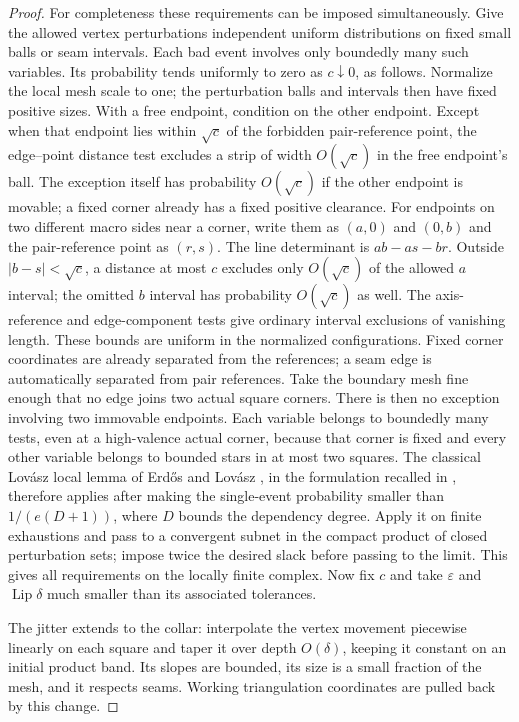 \documentclass[11pt]{article}
\numberwithin{equation}{section}
\theoremstyle{definition}
\theoremstyle{remark}
\DeclareMathOperator{\Lip}{Lip}
\begin{document}
\begin{proof}
For completeness these requirements can be imposed simultaneously.
Give the allowed vertex perturbations independent uniform
distributions on fixed small balls or seam intervals.  Each bad event
involves only boundedly many such variables.  Its probability tends
uniformly to zero as $c\downarrow0$, as follows.  Normalize the local
mesh scale to one; the perturbation balls and intervals then have
fixed positive sizes.  With a free endpoint, condition on the other
endpoint.  Except when that endpoint lies within $\sqrt c$ of the
forbidden pair-reference point, the edge--point distance test excludes
a strip of width $O(\sqrt c)$ in the free endpoint's ball.  The
exception itself has probability $O(\sqrt c)$ if the other endpoint
is movable; a fixed corner already has a fixed positive clearance.
For endpoints on two different macro sides near a corner, write them
as $(a,0)$ and $(0,b)$ and the pair-reference point as $(r,s)$.
The line determinant is $ab-as-br$.  Outside
$|b-s|<\sqrt c$, a distance at most $c$ excludes only
$O(\sqrt c)$ of the allowed $a$ interval; the omitted $b$ interval
has probability $O(\sqrt c)$ as well.  The axis-reference and
edge-component tests give ordinary interval exclusions of vanishing
length.  These bounds are uniform in the normalized configurations.
Fixed corner
coordinates are already separated from the references; a seam edge
is automatically separated from pair references.  Take the boundary
mesh fine enough that no edge joins two actual square corners.
There is then no exception involving two immovable endpoints.
Each variable belongs
to boundedly many tests, even at a high-valence actual corner,
because that corner is fixed and every other variable belongs to
bounded stars in at most two squares.  The classical Lov\'asz local lemma of Erd\H{o}s and Lov\'asz
\cite{ErdosLovasz1975}, in the formulation recalled in
\cite[Theorem~1.1]{MoserTardos2010},
therefore applies after making the single-event probability smaller
than $1/(e(D+1))$, where $D$ bounds the dependency degree.  Apply it on
finite exhaustions and pass to a convergent subnet in the compact
product of closed perturbation sets; impose twice the desired slack
before passing to the limit.  This gives all requirements on the
locally finite complex.  Now fix $c$ and take $\varepsilon$ and
$\Lip\delta$ much smaller than its associated tolerances.

The jitter extends to the collar: interpolate the vertex movement
piecewise linearly on each square and taper it over depth
$O(\delta)$, keeping it constant on an initial product band.
Its slopes are bounded, its size is a small fraction of the mesh,
and it respects seams.  Working triangulation coordinates are pulled
back by this change.


\end{proof}
\end{document}
